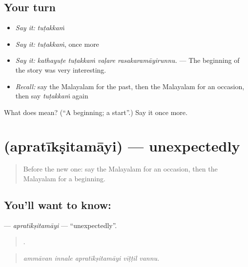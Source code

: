 \subsection*{Your turn}
\begin{itemize}
\raggedright
  \item \emph{Say it:} \emph{tuṭakkaṁ}
  \item \emph{Say it:} \emph{tuṭakkaṁ}, once more
  \item \emph{Say it:} \emph{kathayuṭe tuṭakkaṁ vaḷare rasakaramāyirunnu.} — The beginning of the story was very interesting.
  \item \emph{Recall:} say the Malayalam for the past, then the Malayalam for an occasion, then say \emph{tuṭakkaṁ} again
\end{itemize}

\begin{tcolorbox}[breakable,colback=teal!4,colframe=teal!35!black,title={Before you move on}]
What does  mean? (\textquotedblleft{}A beginning; a start\textquotedblright{}.) Say it once more.
\end{tcolorbox}
\section[\texorpdfstring{\ml{അപ്രതീക്ഷിതമായി} (apratīkṣitamāyi)}{അപ്രതീക്ഷിതമായി (apratīkṣitamāyi)}]{ (apratīkṣitamāyi) — unexpectedly}

\label{lesson:ML-C361-apratiksitamayi}



\begin{quote}
Before the new one: say the Malayalam for an occasion, then the Malayalam for a beginning.
\end{quote}

\subsection*{You'll want to know: }
\textbf{} — \emph{apratīkṣitamāyi} — \textquotedblleft{}unexpectedly\textquotedblright{}.

\begin{quote}
    .
\end{quote}

\begin{quote}
\emph{ammāvan innale apratīkṣitamāyi vīṭṭil vannu.}
\end{quote}

